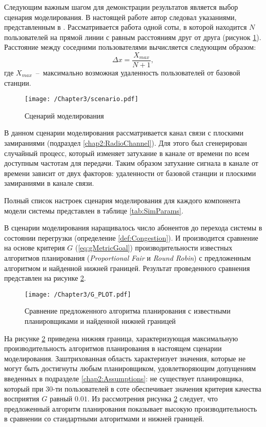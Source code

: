 Следующим важным шагом для демонстрации результатов является выбор сценария моделирования. В настоящей работе автор следовал указаниями, представленным в \cite{simulation}. Рассматривается работа одной соты, в которой находится $N$ пользователей на прямой линии с равным расстояниям друг от друга (рисунок \ref{fig:scenario}). Расстояние между соседними пользователями вычисляется следующим образом:
$$\Delta x = \frac{X_{max}}{N+1},$$
где $X_{max}$~--~максимально возможная удаленность пользователей от базовой станции.

\begin{figure}[htbp]
\begin{center}
\texttt{[image: /Chapter3/scenario.pdf]}
\caption{Сценарий моделирования}
\label{fig:scenario}
\end{center}
\end{figure}

В данном сценарии моделирования рассматривается канал связи с плоскими замираниями (подраздел \ref{chap2:RadioChannel}). Для этого был сгенерирован случайный процесс, который изменяет затухание в канале от времени по всем доступным частотам для передачи. Таким образом затухание сигнала в канале от времени зависит от двух факторов: удаленности от базовой станции и плоскими замираниями в канале связи.

Полный список настроек сценария моделирования для каждого компонента модели системы представлен в таблице \ref{tab:SimParams}.

В сценарии моделирования наращивалось число абонентов до перехода системы в состоянии перегрузки (определение \ref{def:Congestion}). И производится сравнение на основе критерия $G$ (\ref{eq:gMetricGoal}) производительности известных алгоритмов планирования (\textit{Proportional Fair} и \textit{Round Robin}) с предложенным алгоритмом и найденной нижней границей. Результат проведенного сравнения представлен на рисунке \ref{fig:G_PLOT}.

\begin{figure}[htbp]
\begin{center}
\texttt{[image: /Chapter3/G\_PLOT.pdf]}
\caption{Сравнение предложенного алгоритма планирования с известными планировщиками и найденной нижней границей}
\label{fig:G_PLOT}
\end{center}
\end{figure}

На рисунке \ref{fig:G_PLOT} приведена нижняя граница, характеризующая максимальную производительность алгоритмов планирования в настоящем сценарии моделирования. Заштрихованная область характеризует значения, которые не могут быть достигнуты любым планировщиком, удовлетворяющим допущениям введенных в подразделе \ref{chap2:Assumptions}: не существует планировщика, который при 30-ти пользователей в соте обеспечивает значения критерия качества восприятия $G$ равный $0.01$. Из рассмотрения рисунка \ref{fig:G_PLOT} следует, что предложенный алгоритм планирования показывает высокую производительность в сравнении со стандартными алгоритмами и нижней границей.

